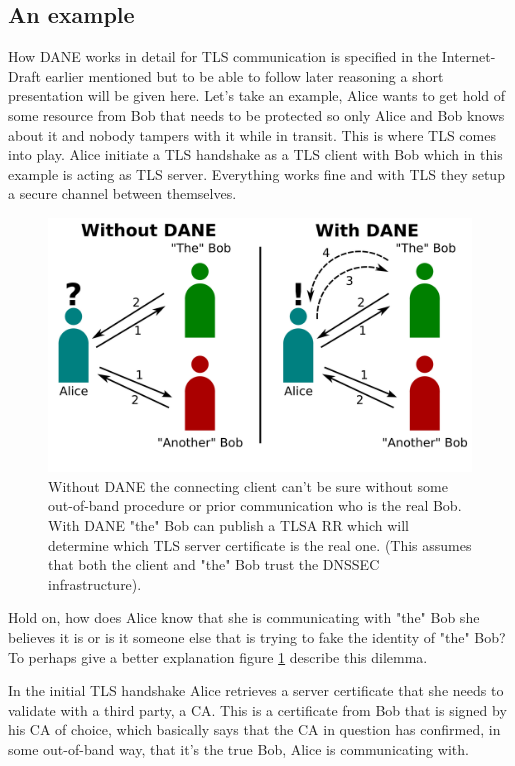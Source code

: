 \subsection{An example}
How DANE works in detail for TLS communication is specified in the Internet-Draft earlier mentioned \cite{rfc:draft-dane} but to be able to follow later reasoning a short presentation will be given here.
Let's take an example, Alice wants to get hold of some resource from Bob that needs to be protected so only Alice and Bob knows about it and nobody tampers with it while in transit.
This is where TLS comes into play.
Alice initiate a TLS handshake as a TLS client with Bob which in this example is acting as TLS server. 
Everything works fine and with TLS they setup a secure channel between themselves.

\begin{figure}[ht]
\begin{center}
\includegraphics[scale=1]{Figures/daneWithAndWithoutDane.png}
\end{center}
\caption{Without DANE the connecting client can't be sure without some out-of-band procedure or prior communication who is the real Bob. With DANE "the" Bob can publish a TLSA RR which will determine which TLS server certificate is the real one. (This assumes that both the client and "the" Bob trust the DNSSEC infrastructure).\label{ch3:daneWithAndWithoutDane}}
\end{figure}


Hold on, how does Alice know that she is communicating with "the" Bob she believes it is or is it someone else that is trying to fake the identity of "the" Bob?
To perhaps give a better explanation figure \ref{ch3:daneWithAndWithoutDane} describe this dilemma.

In the initial TLS handshake Alice retrieves a server certificate that she needs to validate with a third party, a CA.
This is a certificate from Bob that is signed by his CA of choice, which basically says that the CA in question has confirmed, in some out-of-band way, that it's the true Bob, Alice is communicating with.

